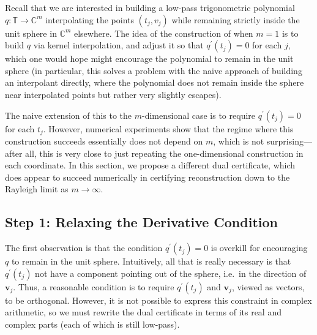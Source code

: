 \documentclass[11pt]{article}
\newcommand{\TT}{\mathbb{T}}
\newcommand{\CC}{\mathbb{C}}
\newcommand{\bv}{\bm v}
\begin{document}
Recall that we are interested in building a low-pass trigonometric polynomial $q: \TT \to \CC^m$ interpolating the points $(t_j, v_j)$ while remaining strictly inside the unit sphere in $\CC^m$ elsewhere.
The idea of the construction of \cite{fernandez2016super} when $m = 1$ is to build $q$ via kernel interpolation, and adjust it so that $q^\prime(t_j) = 0$ for each $j$, which one would hope might encourage the polynomial to remain in the unit sphere (in particular, this solves a problem with the naive approach of building an interpolant directly, where the polynomial does not remain inside the sphere near interpolated points but rather very slightly escapes).

The naive extension of this to the $m$-dimensional case is to require $q^\prime(t_j) = 0$ for each $t_j$.
However, numerical experiments show that the regime where this construction succeeds essentially does not depend on $m$, which is not surprising---after all, this is very close to just repeating the one-dimensional construction in each coordinate.
In this section, we propose a different dual certificate, which does appear to succeed numerically in certifying reconstruction down to the Rayleigh limit as $m \to \infty$.

\subsection{Step 1: Relaxing the Derivative Condition}

The first observation is that the condition $q^\prime(t_j) = 0$ is overkill for encouraging $q$ to remain in the unit sphere.
Intuitively, all that is really necessary is that $q^\prime(t_j)$ not have a component pointing out of the sphere, i.e.\ in the direction of $\bv_j$.
Thus, a reasonable condition is to require $q^\prime(t_j)$ and $\bv_j$, viewed as vectors, to be orthogonal.
However, it is not possible to express this constraint in complex arithmetic, so we must rewrite the dual certificate in terms of its real and complex parts (each of which is still low-pass).
\end{document}

